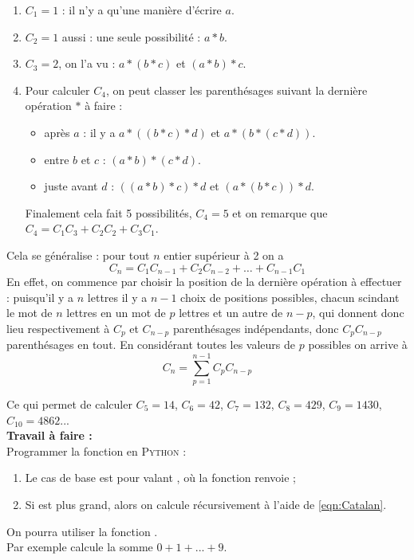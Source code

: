 \documentclass[a4paper,12pt,french]{article}
\begin{document}
\begin{exercice}
\begin{enumerate}[\textbullet]
	\item 	$C_1=1$ : il n'y a qu'une manière d'écrire $a$.
	\item 	$C_2=1$ aussi : une seule possibilité : $a*b$.
	\item 	$C_3=2$, on l'a vu : $a*(b*c)$ et $(a*b)*c$.
	\item 	Pour calculer $C_4$, on peut classer les parenthésages suivant la dernière opération $*$ à faire :
	\begin{itemize}
		\item 	après $a$ : il y a $a*((b*c)*d)$ et $a*(b*(c*d))$.
		\item 	\og entre $b$ et $c$\fg{} : $(a*b)*(c*d)$.
		\item 	juste avant $d$ : $((a*b)*c)*d$ et $(a*(b*c))*d$.
	\end{itemize}
	Finalement cela fait 5 possibilités, $C_4=5$ et on remarque que $C_4=C_1C_3+C_2C_2+C_3C_1$.
\end{enumerate}
Cela se généralise : pour tout $n$ entier supérieur à 2 on a
$$C_n=C_1C_{n-1}+C_2C_{n-2}+\ldots+C_{n-1}C_1$$
En effet, on commence par choisir la position de la dernière opération à effectuer : puisqu'il y a $n$ lettres il y a $n-1$ choix de positions
possibles, chacun scindant le mot de $n$ lettres en un mot de $p$ lettres et un autre de $n-p$, qui donnent donc lieu respectivement à $C_p$ et
$C_{n-p}$ parenthésages indépendants, donc $C_pC_{n-p}$ parenthésages en tout. En considérant toutes les valeurs de $p$ possibles on arrive à
\begin{equation}
\tag{*}
C_n=\sum_{p=1}^{n-1}C_pC_{n-p}
\label{eqn:Catalan}
\end{equation}

Ce qui permet de calculer $C_5 =14$, $C_6 =42$, $C_7 =132$, $C_8 =429$, $C_9 =1430$, $C_{10} =4862$...\\

\textbf{Travail à faire :}\\

Programmer la fonction  en \textsc{Python} :
\begin{enumerate}[--]
	\item 	Le cas de base est pour  valant , où la fonction renvoie ;
	\item 	Si  est plus grand, alors on calcule  récursivement à l'aide de \eqref{eqn:Catalan}.
\end{enumerate}

On pourra utiliser la fonction .\\
Par exemple  calcule la somme $0+1+...+9$.
\end{exercice}
\end{document}
